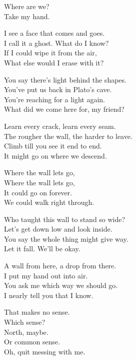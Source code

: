 \begin{lyrics}

Where are we?\\
Take my hand.

I see a face that comes and goes.\\
I call it a ghost. What do I know?\\
If I could wipe it from the air,\\
What else would I erase with it?

You say there’s light behind the shapes.\\
You’ve put us back in Plato’s cave.\\
You’re reaching for a light again.\\
What did we come here for, my friend?

Learn every crack, learn every seam.\\
The rougher the wall, the harder to leave.\\
Climb till you see it end to end.\\
It might go on where we descend.

Where the wall lets go,\\
Where the wall lets go,\\
It could go on forever.\\
We could walk right through.


Who taught this wall to stand so wide?\\
Let’s get down low and look inside.\\
You say the whole thing might give way.\\
Let it fall. We’ll be okay.

A wall from here, a drop from there.\\
I put my hand out into air.\\
You ask me which way we should go.\\
I nearly tell you that I know.


That makes no sense.\\
Which sense?\\
North, maybe.\\
Or common sense.\\
Oh, quit messing with me.


\end{lyrics}
